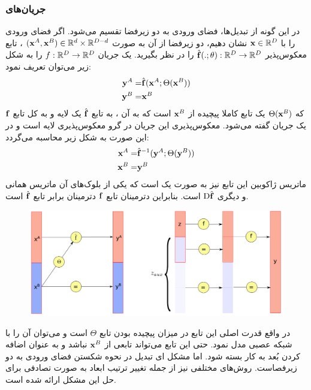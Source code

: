 \subsubsection{جریان‌های
}
در این گونه از تبدیل‌ها، فضای ورودی به دو زیرفضا تقسیم می‌شود. اگر فضای ورودی را با
${\bf x} \in {\mathbb{R}}^D$
نشان دهیم، دو زیرفضا از آن به صورت
$({\bf x}^A, {\bf x}^B) \in {\mathbb{R}}^d \times {\mathbb{R}}^{D - d}$
، تابع معکوس‌پذیر
$\hat{{\bf f}}(.; \theta) : {\mathbb{R}}^D \rightarrow {\mathbb{R}}^D$
را در نظر بگیرید. یک جریان \coupling{}
$f : {\mathbb{R}}^D \rightarrow {\mathbb{R}}^D$
را به شکل زیر می‌توان تعریف نمود:
\begin{align}
	{\bf y}^A = & \hat{{\bf f}} ({\bf x}^A; \Theta({\bf x}^B))
	\nonumber
	\\
	{\bf y}^B = & {\bf x}^B
\end{align}
که $\Theta({\bf x}^B)$ یک تابع کاملا پیچیده از ${\bf x}^B$ است که به آن
، به تابع $\hat{{\bf f}}$ یک لایه \coupling{} و به کل تابع ${\bf f}$ یک جریان \coupling{} گفته می‌شود. معکوس‌پذیری این جریان در گرو معکوس‌پذیری لایه \coupling{} است و در این صورت به شکل زیر محاسبه می‌گردد:
\begin{align}
	{\bf x}^A = & \hat{{\bf f}}^{-1} ({\bf y}^A; \Theta({\bf y}^B))
	\nonumber
	\\
	{\bf x}^B = & {\bf y}^B
\end{align}
ماتریس ژاکوبین این تابع نیز به صورت یک
است که یکی از بلوک‌های آن ماتریس همانی و دیگری $\text{D}\hat{{\bf f}}$ است. بنابراین دترمینان  تابع ${\bf f}$ دترمینان برابر تابع $\hat{{\bf f}}$ است.

\begin{figure}[H]
	\centering
	\includegraphics[width=.7\textwidth]{images/flow-survey1.png}
	\caption{
	}
\end{figure}

در واقع قدرت اصلی این تابع در میزان پیچیده بودن تابع $\Theta$ است و می‌توان آن را با شبکه عصبی مدل نمود. حتی این تابع می‌تواند تابعی از ${\bf x}^B$ نباشد و به عنوان اضافه کردن بُعد به کار بسته شود. اما مشکل ای تبدیل در نحوه شکستن فضای ورودی به دو زیرفصاست. روش‌های مختلفی نیز از جمله تغییر ترتیب ابعاد به صورت تصادفی برای حل این مشکل ارائه شده است.
